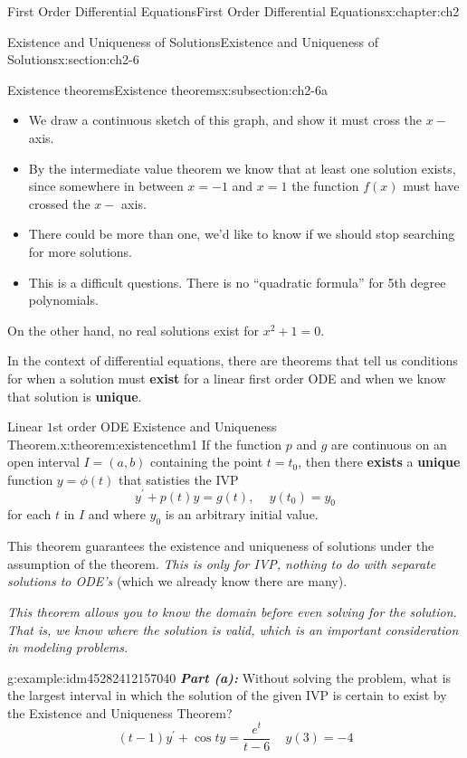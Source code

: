 \documentclass[oneside,10pt,]{book}
\newcommand{\alert}[1]{\textbf{\textit{#1}}}
\newcommand{\terminology}[1]{\textbf{#1}}
\numberwithin{equation}{section}
\numberwithin{equation}{section}
\begin{document}
\begin{chapterptx}{First Order Differential Equations}{}{First Order Differential Equations}{}{}{x:chapter:ch2}
\begin{sectionptx}{Existence and Uniqueness of Solutions}{}{Existence and Uniqueness of Solutions}{}{}{x:section:ch2-6}
\begin{subsectionptx}{Existence theorems}{}{Existence theorems}{}{}{x:subsection:ch2-6a}
%
\begin{itemize}[label=\textbullet]
\item{}We draw a continuous sketch of this graph, and show it must cross the \(x-\)axis.%
\item{}By the intermediate value theorem we know that at least one solution exists, since somewhere in between \(x=-1\) and \(x=1\) the function \(f(x)\) must have crossed the \(x-\) axis.%
\item{}There could be more than one, we'd like to know if we should stop searching for more solutions.%
\item{}This is a difficult questions. There is no ``quadratic formula'' for 5th degree polynomials.%
\end{itemize}
On the other hand, no real solutions exist for \(x^{2}+1=0\).%
\par
In the context of differential equations, there are theorems that tell us conditions for when a solution must \terminology{exist} for a linear first order ODE and when we know that solution is \terminology{unique}.%
\begin{theorem}{Linear \(1\)st order ODE Existence and Uniqueness Theorem.}{}{x:theorem:existencethm1}%
If the function \(p\) and \(g\) are continuous on an open interval \(I=(a,b)\)      containing the point \(t=t_{0}\), then there \terminology{exists} a \terminology{unique} function \(y=\phi(t)\) that satisties the IVP%
\begin{equation*}
y^{\prime}+p(t)y=g(t),\,\,\,\,\,\,\,y(t_{0})=y_{0}
\end{equation*}
for each \(t\) in \(I\) and where \(y_{0}\) is an arbitrary initial value.%
\end{theorem}
This theorem guarantees the existence and uniqueness of solutions under the assumption of the theorem. \emph{This is only for IVP, nothing to do with separate solutions to ODE's} (which we already know there are many).%
\par
\emph{This theorem allows you to know the domain before even solving for the solution. That is, we know where the solution is valid, which is an important consideration in modeling problems.}%
\begin{example}{}{g:example:idm45282412157040}%
\alert{Part (a):} Without solving the problem, what is the largest interval in which the solution of the given IVP is certain to exist by the Existence and Uniqueness Theorem?%
\begin{equation*}
(t-1)y^{\prime}+\cos ty=\frac{e^{t}}{t-6}\,\,\,\,\,\,\,y(3)=-4

\end{equation*}
\end{example}
\end{subsectionptx}
\end{sectionptx}
\end{chapterptx}
\end{document}
